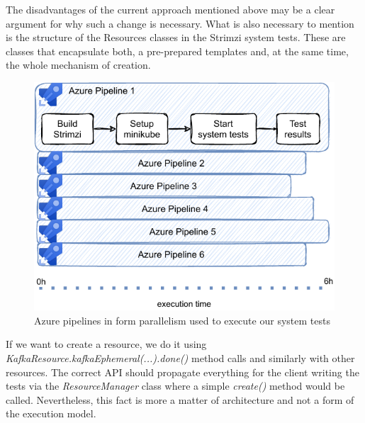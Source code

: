 The disadvantages of the current approach mentioned above may be a clear argument for why such a change is necessary.
What is also necessary to mention is the structure of the Resources classes in the Strimzi system tests.
These are classes that encapsulate both, a pre-prepared templates and, at the same time, the whole mechanism of creation.
\begin{figure}[!ht]
    \centering
    \includegraphics[scale=1]{obrazky-figures/06-proposal-of-parallel-approach/01a-azure_pipelines_with_test_results}
    \caption{Azure pipelines in form parallelism used to execute our system tests}
    \label{05:fig:azurepiplines}
\end{figure}
If we want to create a resource, we do it using \emph{KafkaResource.kafkaEphemeral(...).done()} method calls and similarly with other resources.
The correct API should propagate everything for the client writing the tests via the \emph{ResourceManager} class where a simple \emph{create()} method would be called.
Nevertheless, this fact is more a matter of architecture and not a form of the execution model.

